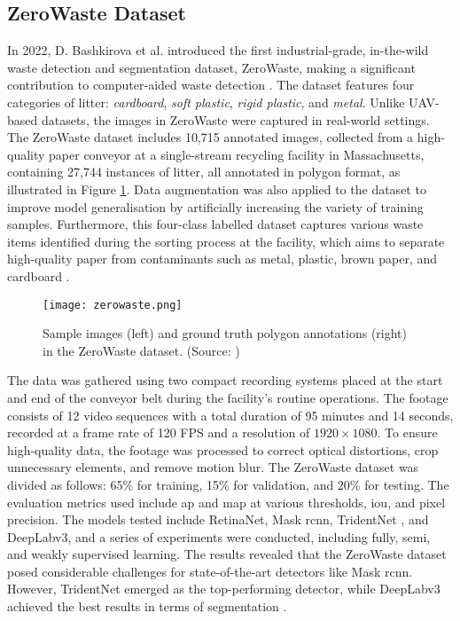 \subsection{ZeroWaste Dataset}
\label{subsec:3_zerowaste}

In 2022, D. Bashkirova et al. introduced the first industrial-grade, in-the-wild waste detection and segmentation dataset, ZeroWaste, making a significant contribution to computer-aided waste detection \cite{zerowaste}. The dataset features four categories of litter: \textit{cardboard}, \textit{soft plastic}, \textit{rigid plastic}, and \textit{metal}. Unlike UAV-based datasets, the images in ZeroWaste were captured in real-world settings.
The ZeroWaste dataset includes 10,715 annotated images, collected from a high-quality paper conveyor at a single-stream recycling facility in Massachusetts, containing 27,744 instances of litter, all annotated in polygon format, as illustrated in Figure \ref{fig:zerowaste}. Data augmentation was also applied to the dataset to improve model generalisation by artificially increasing the variety of training samples. Furthermore, this four-class labelled dataset captures various waste items identified during the sorting process at the facility, which aims to separate high-quality paper from contaminants such as metal, plastic, brown paper, and cardboard \cite{zerowaste}.

\begin{figure}[!htbp]
    \centering
    \texttt{[image: zerowaste.png]}
    \caption{Sample images (left) and ground truth polygon annotations (right) in the ZeroWaste dataset. (Source: \cite{zerowaste})}
    \label{fig:zerowaste}
\end{figure}

The data was gathered using two compact recording systems placed at the start and end of the conveyor belt during the facility's routine operations. The footage consists of 12 video sequences with a total duration of 95 minutes and 14 seconds, recorded at a frame rate of 120 FPS and a resolution of $1920 \times 1080$. To ensure high-quality data, the footage was processed to correct optical distortions, crop unnecessary elements, and remove motion blur.
The ZeroWaste dataset was divided as follows: 65\% for training, 15\% for validation, and 20\% for testing. The evaluation metrics used include \gls{ap} and \gls{map} at various thresholds, \gls{iou}, and pixel precision. The models tested include RetinaNet, Mask \gls{rcnn}, TridentNet \cite{tridentnet}, and DeepLabv3, and a series of experiments were conducted, including fully, semi, and weakly supervised learning.
The results revealed that the ZeroWaste dataset posed considerable challenges for state-of-the-art detectors like Mask \gls{rcnn}. However, TridentNet emerged as the top-performing detector, while DeepLabv3 achieved the best results in terms of segmentation \cite{zerowaste}.

